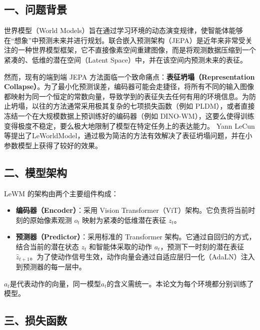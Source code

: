 \hypertarget{ux4e00ux95eeux9898ux80ccux666f-14}{%
\subsection{一、问题背景}\label{ux4e00ux95eeux9898ux80ccux666f-14}}

世界模型（World Models）旨在通过学习环境的动态演变规律，使智能体能够在``想象''中预测未来并进行规划。联合嵌入预测架构（JEPA）是近年来非常受关注的一种世界模型框架，它不直接像素空间重建图像，而是将观测数据压缩到一个紧凑的、低维的潜在空间（Latent Space）中，并在该空间内预测未来的表征。

然而，现有的端到端 JEPA 方法面临一个致命痛点：\textbf{表征坍塌（Representation Collapse）}。为了最小化预测误差，编码器可能会走捷径，将所有不同的输入图像都映射为同一个恒定的常数向量，导致学到的表征失去任何有用的环境信息。为防止坍塌，以往的方法通常采用极其复杂的七项损失函数（例如 PLDM），或者直接冻结一个在大规模数据上预训练好的编码器（例如 DINO-WM），这要么使得训练变得极度不稳定，要么极大地限制了模型在特定任务上的表达能力。
Yann LeCun等提出了LeWorldModel，通过极为简洁的方法有效解决了表征坍塌问题，并在小参数模型上获得了较好的效果。

\hypertarget{ux4e8cux6a21ux578bux67b6ux6784-4}{%
\subsection{二、模型架构}\label{ux4e8cux6a21ux578bux67b6ux6784-4}}

LeWM 的架构由两个主要组件构成：

\begin{itemize}
\tightlist
\item
  \textbf{编码器（Encoder）}：采用 Vision Transformer（ViT）架构。它负责将当前时刻的原始像素观测 \(o_t\) 映射为紧凑的低维潜在表征 \(z_t\)。
\item
  \textbf{预测器（Predictor）}：采用标准的 Transformer 架构。它通过自回归的方式，结合当前的潜在状态 \(z_t\) 和智能体采取的动作 \(a_t\)，预测下一时刻的潜在表征 \(\hat{z}_{t+1}\)。为了使动作信号生效，动作向量会通过自适应层归一化（AdaLN）注入到预测器的每一层中。
\end{itemize}

\(a_t\)是代表动作的向量，同一模型\(a_t\)的含义需统一。本论文为每个环境都分别训练了模型。

\hypertarget{ux4e09ux635fux5931ux51fdux6570-4}{%
\subsection{三、损失函数}\label{ux4e09ux635fux5931ux51fdux6570-4}}

